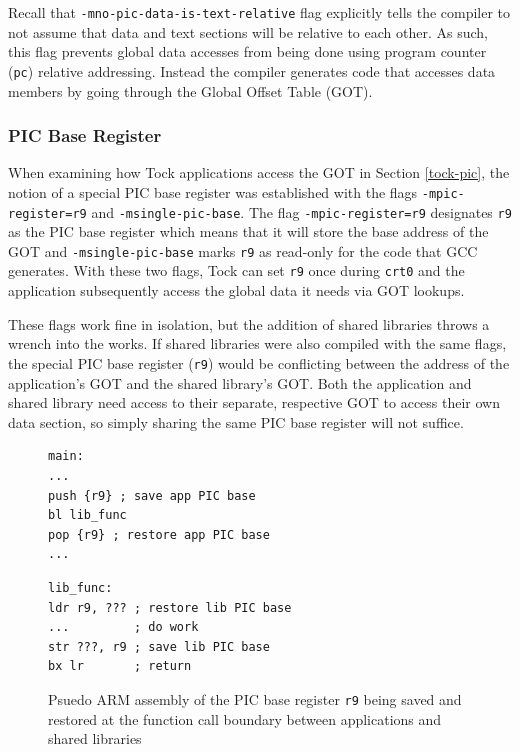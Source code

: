\documentclass[12pt]{ucsddissertation}
\begin{document}
Recall that \texttt{-mno-pic-data-is-text-relative} flag explicitly tells the compiler to not assume that data and text sections will be relative to each other. As such, this flag prevents global data accesses from being done using program counter (\texttt{pc}) relative addressing. Instead the compiler generates code that accesses data members by going through the Global Offset Table (GOT).

\subsubsection{PIC Base Register}

When examining how Tock applications access the GOT in Section \ref{tock-pic}, the notion of a special PIC base register was established with the flags \texttt{-mpic-register=r9} and \texttt{-msingle-pic-base}. The flag \texttt{-mpic-register=r9} designates \texttt{r9} as the PIC base register which means that it will store the base address of the GOT and \texttt{-msingle-pic-base} marks \texttt{r9} as read-only for the code that GCC generates. With these two flags, Tock can set \texttt{r9} once during \texttt{crt0} and the application subsequently access the global data it needs via GOT lookups.

These flags work fine in isolation, but the addition of shared libraries throws a wrench into the works. If shared libraries were also compiled with the same flags, the special PIC base register (\texttt{r9}) would be conflicting between the address of the application's GOT and the shared library's GOT. Both the application and shared library need access to their separate, respective GOT to access their own data section, so simply sharing the same PIC base register will not suffice. 
\begin{figure}[!h]
\centering
 \begin{minipage}{0.47\textwidth}
  \centering
  \begin{verbatim}
main:
...
push {r9} ; save app PIC base
bl lib_func
pop {r9} ; restore app PIC base
...
  \end{verbatim}
     \caption[]{Application}
 \end{minipage}
 \begin{minipage}{0.47\textwidth}
  \centering
  \begin{verbatim}
lib_func:
ldr r9, ??? ; restore lib PIC base
...         ; do work
str ???, r9 ; save lib PIC base
bx lr       ; return
  \end{verbatim}
     \caption[]{Shared Library}
 \end{minipage}
    \caption[Saving and Restoring PIC base register]{Psuedo ARM assembly of the PIC base register \texttt{r9} being saved and restored at the function call boundary between applications and shared libraries}
  \label{fig:saver9}
\end{figure}
\end{document}
